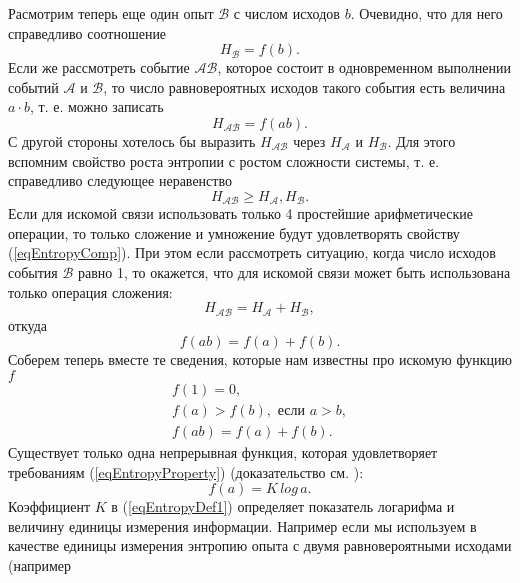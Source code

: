 Расмотрим теперь еще один опыт $\mathcal{B}$ с числом исходов
$b$. Очевидно, что для него справедливо соотношение
\[
H_{\mathcal{B}} = f\left(b\right).
\]
Если же рассмотреть событие $\mathcal{A}\mathcal{B}$,
которое состоит в одновременном выполнении событий $\mathcal{A}$ и
$\mathcal{B}$, то число равновероятных исходов такого
события есть величина $a\cdot b$, т. е. можно записать
\[
H_{\mathcal{A}\mathcal{B}} = f\left(ab\right).
\]
С другой стороны хотелось бы выразить $H_{\mathcal{A}\mathcal{B}}$
через $H_{\mathcal{A}}$ и $H_{\mathcal{B}}$. Для этого вспомним
свойство роста энтропии с ростом сложности системы, т. е. справедливо
следующее неравенство
\begin{equation}
H_{\mathcal{A}\mathcal{B}} \ge H_{\mathcal{A}}, H_{\mathcal{B}}.
\label{eqEntropyComp}
\end{equation}
Если для искомой связи использовать только 4 простейшие арифметические
операции, то только сложение и умножение будут удовлетворять свойству
(\ref{eqEntropyComp}). При этом если рассмотреть ситуацию, когда число
исходов события $\mathcal{B}$ равно 1, то окажется, что для искомой
связи может быть использована только операция сложения:
\begin{equation}
H_{\mathcal{A}\mathcal{B}} = H_{\mathcal{A}} + H_{\mathcal{B}},
\nonumber
\end{equation}
откуда
\begin{equation}
f\left(ab\right) = f\left(a\right) + f\left(b\right).
\nonumber
\end{equation}
Соберем теперь вместе те сведения, которые нам известны про искомую
функцию $f$
\begin{eqnarray}
f\left(1\right) = 0,
\nonumber \\
f\left(a\right) > f\left(b\right), \mbox{ если } a > b,
\nonumber \\
f\left(a b\right) = f\left(a\right) + f\left(b\right).
\label{eqEntropyProperty}
\end{eqnarray}
Существует только одна непрерывная функция, которая удовлетворяет
требованиям (\ref{eqEntropyProperty}) (доказательство
см. \cite{bYaglom}):
\begin{equation}
f\left(a\right) = K\,log\,a.
\label{eqEntropyDef1}
\end{equation}
Коэффициент $K$ в (\ref{eqEntropyDef1}) определяет показатель логарифма и величину единицы
измерения информации. Например если мы используем в качестве единицы
измерения энтропию опыта с двумя равновероятными исходами (например

